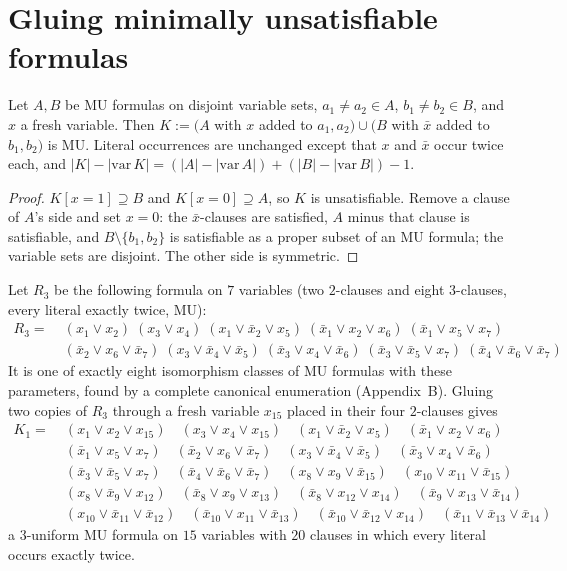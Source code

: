 \documentclass[11pt]{article}
\theoremstyle{remark}\newtheorem{remark}[theorem]{Remark}
\begin{document}
\section{Gluing minimally unsatisfiable formulas}
\begin{lemma}[Gluing]\label{glue}
Let $A,B$ be MU formulas on disjoint variable sets, $a_1\ne a_2\in A$, $b_1\ne b_2\in B$, and $x$ a fresh variable. Then $K:=(A$ with $x$ added to $a_1,a_2)\cup(B$ with $\bar x$ added to $b_1,b_2)$ is MU. Literal occurrences are unchanged except that $x$ and $\bar x$ occur twice each, and $|K|-|\mathrm{var}\,K|=(|A|-|\mathrm{var}\,A|)+(|B|-|\mathrm{var}\,B|)-1$.
\end{lemma}
\begin{proof}
$K[x{=}1]\supseteq B$ and $K[x{=}0]\supseteq A$, so $K$ is unsatisfiable. Remove a clause of $A$'s side and set $x=0$: the $\bar x$-clauses are satisfied, $A$ minus that clause is satisfiable, and $B\setminus\{b_1,b_2\}$ is satisfiable as a proper subset of an MU formula; the variable sets are disjoint. The other side is symmetric.
\end{proof}
Let $R_3$ be the following formula on $7$ variables (two $2$-clauses and eight $3$-clauses, every literal exactly twice, MU):
\begin{align*}R_3=\;&(x_{1}\vee x_{2}) \; (x_{3}\vee x_{4}) \; (x_{1}\vee \bar x_{2}\vee x_{5}) \; (\bar x_{1}\vee x_{2}\vee x_{6}) \; (\bar x_{1}\vee x_{5}\vee x_{7})\\ &(\bar x_{2}\vee x_{6}\vee \bar x_{7}) \; (x_{3}\vee \bar x_{4}\vee \bar x_{5}) \; (\bar x_{3}\vee x_{4}\vee \bar x_{6}) \; (\bar x_{3}\vee \bar x_{5}\vee x_{7}) \; (\bar x_{4}\vee \bar x_{6}\vee \bar x_{7})\end{align*}
It is one of exactly eight isomorphism classes of MU formulas with these parameters, found by a complete canonical enumeration (Appendix~B). Gluing two copies of $R_3$ through a fresh variable $x_{15}$ placed in their four $2$-clauses gives
\begin{align*}K_1=\;&(x_{1}\vee x_{2}\vee x_{15})\quad (x_{3}\vee x_{4}\vee x_{15})\quad (x_{1}\vee \bar x_{2}\vee x_{5})\quad (\bar x_{1}\vee x_{2}\vee x_{6})\\
&(\bar x_{1}\vee x_{5}\vee x_{7})\quad (\bar x_{2}\vee x_{6}\vee \bar x_{7})\quad (x_{3}\vee \bar x_{4}\vee \bar x_{5})\quad (\bar x_{3}\vee x_{4}\vee \bar x_{6})\\
&(\bar x_{3}\vee \bar x_{5}\vee x_{7})\quad (\bar x_{4}\vee \bar x_{6}\vee \bar x_{7})\quad (x_{8}\vee x_{9}\vee \bar x_{15})\quad (x_{10}\vee x_{11}\vee \bar x_{15})\\
&(x_{8}\vee \bar x_{9}\vee x_{12})\quad (\bar x_{8}\vee x_{9}\vee x_{13})\quad (\bar x_{8}\vee x_{12}\vee x_{14})\quad (\bar x_{9}\vee x_{13}\vee \bar x_{14})\\
&(x_{10}\vee \bar x_{11}\vee \bar x_{12})\quad (\bar x_{10}\vee x_{11}\vee \bar x_{13})\quad (\bar x_{10}\vee \bar x_{12}\vee x_{14})\quad (\bar x_{11}\vee \bar x_{13}\vee \bar x_{14})\end{align*}
a $3$-uniform MU formula on $15$ variables with $20$ clauses in which every literal occurs exactly twice.
\end{document}
